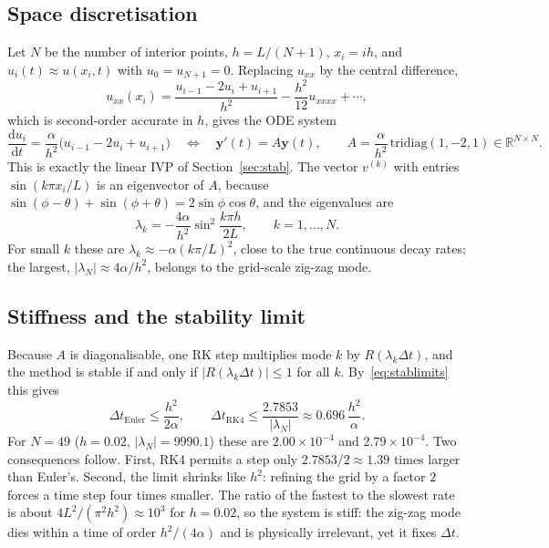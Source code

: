 \documentclass[11pt,a4paper]{article}
\newcommand{\dd}{\mathrm{d}}
\newcommand{\R}{\mathbb{R}}
\newcommand{\Dt}{\Delta t}
\newcommand{\bfy}{\mathbf{y}}
\begin{document}
\subsection{Space discretisation}

Let $N$ be the number of interior points, $h=L/(N+1)$, $x_i=ih$, and $u_i(t)\approx u(x_i,t)$ with
$u_0=u_{N+1}=0$. Replacing $u_{xx}$ by the central difference,
\begin{equation}
u_{xx}(x_i)=\frac{u_{i-1}-2u_i+u_{i+1}}{h^2}-\frac{h^2}{12}u_{xxxx}+\cdots,
\end{equation}
which is second-order accurate in $h$, gives the ODE system
\begin{equation}
\frac{\dd u_i}{\dd t}=\frac{\alpha}{h^2}\bigl(u_{i-1}-2u_i+u_{i+1}\bigr)
\quad\Longleftrightarrow\quad
\bfy'(t)=A\bfy(t),\qquad A=\frac{\alpha}{h^2}\,\mathrm{tridiag}(1,-2,1)\in\R^{N\times N}.
\label{eq:mol}
\end{equation}
This is exactly the linear IVP of Section~\ref{sec:stab}. The vector $v^{(k)}$ with entries
$\sin(k\pi x_i/L)$ is an eigenvector of $A$, because
$\sin(\phi-\theta)+\sin(\phi+\theta)=2\sin\phi\cos\theta$, and the eigenvalues are
\begin{equation}
\lambda_k=-\frac{4\alpha}{h^2}\sin^2\!\frac{k\pi h}{2L},\qquad k=1,\dots,N.
\label{eq:eig}
\end{equation}
For small $k$ these are $\lambda_k\approx-\alpha(k\pi/L)^2$, close to the true continuous decay rates;
the largest, $|\lambda_N|\approx4\alpha/h^2$, belongs to the grid-scale zig-zag mode.

\subsection{Stiffness and the stability limit}

Because $A$ is diagonalisable, one RK step multiplies mode $k$ by $R(\lambda_k\Dt)$, and the method is
stable if and only if $|R(\lambda_k\Dt)|\le1$ for all $k$. By~\eqref{eq:stablimits} this gives
\begin{equation}
\Dt_{\mathrm{Euler}}\le\frac{h^2}{2\alpha},\qquad
\Dt_{\mathrm{RK4}}\le\frac{2.7853}{|\lambda_N|}\approx0.696\,\frac{h^2}{\alpha}.
\label{eq:dtlimit}
\end{equation}
For $N=49$ ($h=0.02$, $|\lambda_N|=9990.1$) these are $2.00\times10^{-4}$ and $2.79\times10^{-4}$.
Two consequences follow. First, RK4 permits a step only $2.7853/2\approx1.39$ times larger than Euler's.
Second, the limit shrinks like $h^2$: refining the grid by a factor $2$ forces a time step four times
smaller. The ratio of the fastest to the slowest rate is about $4L^2/(\pi^2h^2)\approx10^3$ for
$h=0.02$, so the system is stiff: the zig-zag mode dies within a time of order $h^2/(4\alpha)$ and is
physically irrelevant, yet it fixes $\Dt$.
\end{document}
